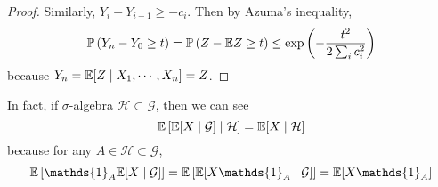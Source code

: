 \begin{enumerate}[label=\arabic{*}.]
\begin{proof}
	    Similarly, $Y_i - Y_{i-1} \geq -c_i$. Then by Azuma's inequality,
	    \begin{equation*}
	    	\mathbb{P}\left(Y_n - Y_0 \geq t\right) = \mathbb{P}\left(Z - \mathbb{E} Z \geq t\right) \leq \exp\left(-\frac{t^2}{2 \sum_i c_i^2}\right)
	    \end{equation*}
	    because $Y_n =  \mathbb{E}[Z \mid X_1,\cdots, X_n] = Z$.
	\end{proof}
	\begin{rmk}
	    In fact, if $\sigma$-algebra $\mathcal{H} \subset \mathcal{G}$, then we can see
	    \begin{equation*}
	        \mathbb{E}\left[\mathbb{E}[X \mid \mathcal{G}] \mid \mathcal{H}\right] = \mathbb{E}[X \mid \mathcal{H}]
	    \end{equation*}
	    because for any $A \in \mathcal{H} \subset \mathcal{G}$,
	    \begin{equation*}
	        \E\bj{\mathds{1}_A\E[X \mid \mathcal{G}]} = \E\bj{\E[X\mathds{1}_A \mid \mathcal{G}]} = \E[X\mathds{1}_A]
	    \end{equation*}
	\end{rmk}
\end{enumerate}

